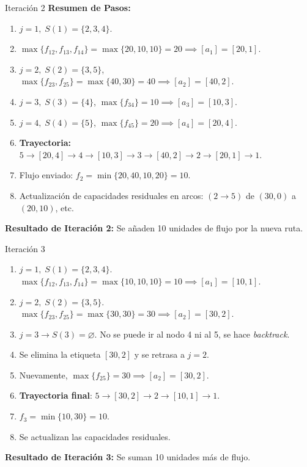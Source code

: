 \documentclass{beamer}
\begin{document}
\begin{frame}{Iteración 2}
\small
\textbf{Resumen de Pasos:}
\begin{enumerate}
    \item \(\displaystyle j=1,\; S(1)=\{2,3,4\}\).
    \item \(\max\{f_{12}, f_{13}, f_{14}\} = \max\{20,10,10\} = 20 \implies [a_1] = [20,1]\).
    \item \(\displaystyle j=2,\; S(2)=\{3,5\}\), \(\max\{f_{23}, f_{25}\} = \max\{40,30\} = 40 \implies [a_2] = [40,2]\).
    \item \(\displaystyle j=3,\; S(3)=\{4\}\), \(\max\{f_{34}\} = 10 \implies [a_3]=[10,3]\).
    \item \(\displaystyle j=4,\; S(4)=\{5\}\), \(\max\{f_{45}\} = 20 \implies [a_4]=[20,4]\).
    \item \textbf{Trayectoria:} \(5 \to [20,4] \to 4 \to [10,3] \to 3 \to [40,2] \to 2 \to [20,1] \to 1\).
    \item Flujo enviado: \(f_2 = \min\{20,40,10,20\} = 10\).
    \item Actualización de capacidades residuales en arcos: 
          \((2\to5)\) de \((30,0)\) a \((20,10)\), etc.
\end{enumerate}

\textbf{Resultado de Iteración 2:} Se añaden 10 unidades de flujo por la nueva ruta.
\end{frame}

\begin{frame}{Iteración 3}
\small
\begin{enumerate}
    \item \(\displaystyle j=1,\; S(1) = \{2,3,4\}\). 
          \(\max\{f_{12},f_{13},f_{14}\} = \max\{10,10,10\}=10\implies[a_1] = [10,1]\).
    \item \(\displaystyle j=2,\; S(2) = \{3,5\}\). 
          \(\max\{f_{23}, f_{25}\} = \max\{30,30\}=30\implies[a_2] = [30,2]\).
    \item \(\displaystyle j=3 \to S(3)= \varnothing\). 
          No se puede ir al nodo 4 ni al 5, se hace \emph{backtrack}.
    \item Se elimina la etiqueta \([30,2]\) y se retrasa a \(j=2\). 
    \item Nuevamente, \(\max\{f_{25}\}=30 \implies[a_2] = [30,2]\).
    \item \textbf{Trayectoria final}: \(5 \to [30,2] \to 2 \to [10,1] \to 1\).
    \item \(\displaystyle f_3 = \min\{10,30\}=10\).
    \item Se actualizan las capacidades residuales.
\end{enumerate}

\textbf{Resultado de Iteración 3:} Se suman 10 unidades más de flujo.
\end{frame}
\end{document}

